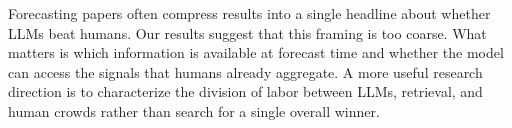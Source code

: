  Forecasting papers often compress results into a single headline about whether LLMs beat humans. Our results suggest that this framing is too coarse. What matters is which information is available at forecast time and whether the model can access the signals that humans already aggregate. A more useful research direction is to characterize the division of labor between LLMs, retrieval, and human crowds rather than search for a single overall winner.

